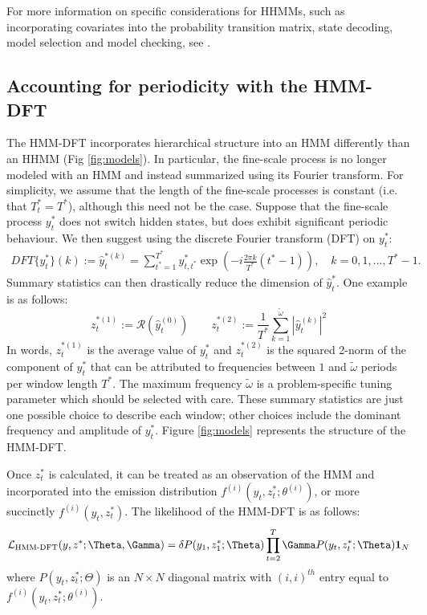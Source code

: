 For more information on specific considerations for HHMMs, such as incorporating covariates into the probability transition matrix, state decoding, model selection and model checking, see \citet{Adam:2019}.

\subsection{Accounting for periodicity with the HMM-DFT}
\label{subsec:STFT}

The HMM-DFT incorporates hierarchical structure into an HMM differently than an HHMM (Fig \ref{fig:models}). In particular, the fine-scale process is no longer modeled with an HMM and instead summarized using its Fourier transform. For simplicity, we assume that the length of the fine-scale processes is constant (i.e. that $T^*_t = T^*$), although this need not be the case. Suppose that the fine-scale process $y^*_t$ does not switch hidden states, but does exhibit significant periodic behaviour. We then suggest using the discrete Fourier transform (DFT) on $y^*_t$:
%
\begin{align*}
    DFT\{y^*_t\}(k) := \hat{y}^{*(k)}_{t} = \sum_{t^* = 1}^{T^*} y^*_{t,t^*}\exp\left(-i \frac{2\pi k}{T^*} (t^*-1)\right), \quad k = 0, 1, \ldots, T^*-1.
\end{align*}
%
Summary statistics can then drastically reduce the dimension of $\hat{y}^*_t$. One example is as follows:
%
\begin{equation}
    \label{eqn:z}
    z_t^{*(1)} := \mathcal{R}\left(\hat{y}^{(0)}_t\right) \qquad z_t^{*(2)} := \frac{1}{T^*}\sum_{k=1}^{\tilde{\omega}}|\hat{y}^{(k)}_t|^2
\end{equation}
%
In words, $z_t^{*(1)}$ is the average value of $y^*_t$ and $z_t^{*(2)}$ is the squared 2-norm of the component of $y^*_t$ that can be attributed to frequencies between $1$ and $\tilde{\omega}$ periods per window length $T^*$. The maximum frequency $\tilde{\omega}$ is a problem-specific tuning parameter which should be selected with care. These summary statistics are just one possible choice to describe each window; other choices include the dominant frequency and amplitude of $y^*_t$. Figure \ref{fig:models} represents the structure of the HMM-DFT.

Once $z^*_t$ is calculated, it can be treated as an observation of the HMM and incorporated into the emission distribution $f^{(i)}\left(y_t,z^*_t;\theta^{(i)}\right)$, or more succinctly $f^{(i)}\left(y_t,z^*_t\right)$. The likelihood of the HMM-DFT is as follows:
\begin{equation}
    \calL_{\text{HMM-DFT}}(y,z^*;\Theta,\Gamma) = \delta P(y_1,z^*_1;\Theta) \prod_{t=2}^T \Gamma P(y_t,z^*_t;\Theta) \mathbf{1}_N
    \label{HMMDFT_likelihood}
\end{equation}
where $P(y_t,z^*_t;\Theta)$ is an $N \times N$ diagonal matrix with $(i,i)^{th}$ entry equal to $f^{(i)}\left(y_t,z^*_t;\theta^{(i)}\right)$.

